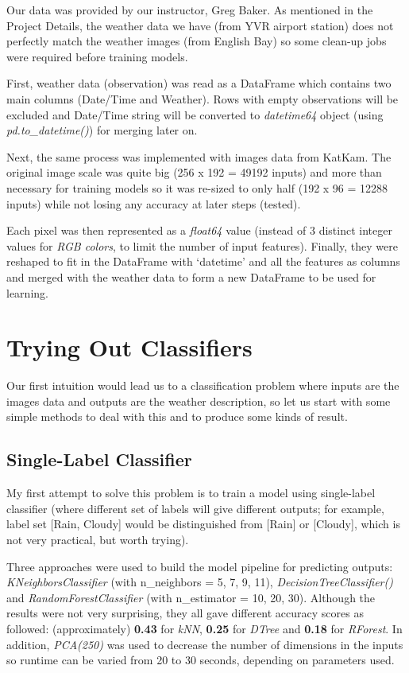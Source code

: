Our data was provided by our instructor, Greg Baker. As mentioned in the Project Details, the weather data we have (from YVR airport station) does not perfectly match the weather images (from English Bay) so some clean-up jobs were required before training models. 

First, weather data (observation) was read as a DataFrame which contains two main columns (Date/Time and Weather). Rows with empty observations will be excluded and Date/Time string will be converted to \textit{datetime64} object (using \textit{pd.to\_datetime()}) for merging later on.

Next, the same process was implemented with images data from KatKam. The original image scale was quite big (256 x 192 = 49192 inputs) and more than necessary for training models so it was re-sized to only half (192 x 96 = 12288 inputs) while not losing any accuracy at later steps (tested). 

Each pixel was then represented as a \textit{float64} value (instead of 3 distinct integer values for \textit{RGB colors}, to limit the number of input features). Finally, they were reshaped to fit in the DataFrame with `datetime' and all the features as columns and merged with the weather data to form a new DataFrame to be used for learning.

\newpage

\section{Trying Out Classifiers}

Our first intuition would lead us to a classification problem where inputs are the images data and outputs are the weather description, so let us start with some simple methods to deal with this and to produce some kinds of result. 

\subsection{Single-Label Classifier}

My first attempt to solve this problem is to train a model using single-label classifier (where different set of labels will give different outputs; for example, label set [Rain, Cloudy] would be distinguished from [Rain] or [Cloudy], which is not very practical, but worth trying).

Three approaches were used to build the model pipeline for predicting outputs: \textit{KNeighborsClassifier} (with n\_neighbors = 5, 7, 9, 11), \textit{DecisionTreeClassifier()} and \textit{RandomForestClassifier} (with n\_estimator = 10, 20, 30). Although the results were not very surprising, they all gave different accuracy scores as followed: (approximately) \textbf{0.43} for \textit{kNN}, \textbf{0.25} for \textit{DTree} and \textbf{0.18} for \textit{RForest}. In addition, \textit{PCA(250)} was used to decrease the number of dimensions in the inputs so runtime can be varied from 20 to 30 seconds, depending on parameters used. 

